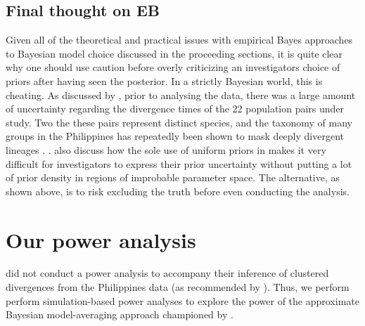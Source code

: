 \documentclass[letterpaper,12pt]{article}
\begin{document}
\begin{linenumbers}
\subsection*{Final thought on EB}
Given all of the theoretical and practical issues with empirical Bayes
approaches to Bayesian model choice discussed in the proceeding sections, it is
quite clear why one should use caution before overly criticizing an
investigators choice of priors after having seen the posterior.
In a strictly Bayesian world, this is cheating.
As discussed by \citet{Oaks2012}, prior to analysing the data, there was a large
amount of uncertainty regarding the divergence times of the 22 population pairs
under study.
Two the these pairs represent distinct species, and the taxonomy of many groups
in the Philippines has repeatedly been shown to mask deeply divergent lineages
\citep{RafeDiesmosAlcala2008,Linkem2010,Siler2010,Welton2010,Siler2011HerpMonographs,
Siler2011,Siler2012,RafeStuart2012}.
.
\citet{Oaks2012} also discuss how the sole use of uniform priors in \msb makes
it very difficult for investigators to express their prior uncertainty without
putting a lot of prior density in regions of improbable parameter space.
The alternative, as shown above, is to risk excluding the truth before even
conducting the analysis.






\section*{Our power analysis}
\citet{Hickerson2013} did not conduct a power analysis to accompany their
inference of clustered divergences from the Philippines data (as recommended by
\citet{Oaks2012}).
Thus, we perform perform simulation-based power analyses to explore the
power of the approximate Bayesian model-averaging approach championed
by \citet{Hickerson2013}.


\end{linenumbers}
\end{document}
